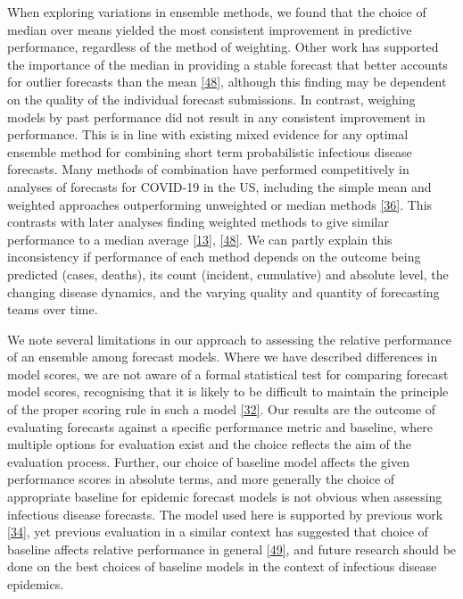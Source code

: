 \documentclass[
]{article}
\begin{document}
When exploring variations in ensemble methods, we found that the choice of median over means yielded the most consistent improvement in predictive performance, regardless of the method of weighting. Other work has supported the importance of the median in providing a stable forecast that better accounts for outlier forecasts than the mean \protect\hyperlink{ref-brooksComparingEnsembleApproaches2020}{{[}48{]}}, although this finding may be dependent on the quality of the individual forecast submissions. In contrast, weighing models by past performance did not result in any consistent improvement in performance. This is in line with existing mixed evidence for any optimal ensemble method for combining short term probabilistic infectious disease forecasts. Many methods of combination have performed competitively in analyses of forecasts for COVID-19 in the US, including the simple mean and weighted approaches outperforming unweighted or median methods \protect\hyperlink{ref-taylorCombiningProbabilisticForecasts2021}{{[}36{]}}. This contrasts with later analyses finding weighted methods to give similar performance to a median average \protect\hyperlink{ref-rayEnsembleForecastsCoronavirus2020e}{{[}13{]}}, \protect\hyperlink{ref-brooksComparingEnsembleApproaches2020}{{[}48{]}}. We can partly explain this inconsistency if performance of each method depends on the outcome being predicted (cases, deaths), its count (incident, cumulative) and absolute level, the changing disease dynamics, and the varying quality and quantity of forecasting teams over time.

We note several limitations in our approach to assessing the relative performance of an ensemble among forecast models. Where we have described differences in model scores, we are not aware of a formal statistical test for comparing forecast model scores, recognising that it is likely to be difficult to maintain the principle of the proper scoring rule in such a model \protect\hyperlink{ref-bracherEvaluatingEpidemicForecasts2021}{{[}32{]}}. Our results are the outcome of evaluating forecasts against a specific performance metric and baseline, where multiple options for evaluation exist and the choice reflects the aim of the evaluation process. Further, our choice of baseline model affects the given performance scores in absolute terms, and more generally the choice of appropriate baseline for epidemic forecast models is not obvious when assessing infectious disease forecasts. The model used here is supported by previous work \protect\hyperlink{ref-cramerEvaluationIndividualEnsemble2021}{{[}34{]}}, yet previous evaluation in a similar context has suggested that choice of baseline affects relative performance in general \protect\hyperlink{ref-bracherNationalSubnationalShortterm2021}{{[}49{]}}, and future research should be done on the best choices of baseline models in the context of infectious disease epidemics.
\end{document}
